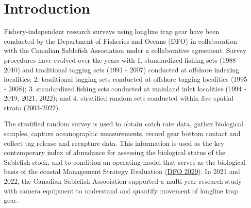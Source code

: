 \documentclass[12pt]{article}\usepackage[]{graphicx}\usepackage[]{color}
\begin{document}

\frontmatter


\renewcommand{\headrulewidth}{0.5pt}  %
\renewcommand{\footrulewidth}{0.5pt}  %

\newcommand{\lt}{\ensuremath <}
\newcommand{\gt}{\ensuremath >}

\newlength{\cslhangindent}
\setlength{\cslhangindent}{1.5em}
\newenvironment{cslreferences}%
  {}%
  {\par}

\hypertarget{sec:introduction}{%
\section{Introduction}\label{sec:introduction}}

Fishery-independent research surveys using longline trap gear have been conducted by the Department of Fisheries and Oceans (DFO) in collaboration with the Canadian Sablefish Association under a collaborative agreement. Survey procedures have evolved over the years with 1. standardized fishing sets (1988 - 2010) and traditional tagging sets (1991 - 2007) conducted at offshore indexing localities; 2. traditional tagging sets conducted at offshore tagging localities (1995 - 2008); 3. standardized fishing sets conducted at mainland inlet localities (1994 - 2019, 2021, 2022); and 4. stratified random sets conducted within five spatial strata (2003-2022).

The stratified random survey is used to obtain catch rate data, gather biological samples, capture oceanographic measurements, record gear bottom contact and collect tag release and recapture data. This information is used as the key contemporary index of abundance for assessing the biological status of the Sablefish stock, and to condition an operating model that serves as the biological basis of the coastal Management Strategy Evaluation (\protect\hyperlink{ref-DFO2020}{DFO 2020}). In 2021 and 2022, the Canadian Sablefish Association supported a multi-year research study with camera equipment to understand and quantify movement of longline trap gear.
\end{document}
